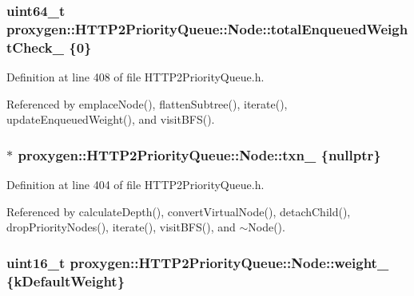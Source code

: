 \subsubsection[{total\+Enqueued\+Weight\+Check\+\_\+}]{\setlength{\rightskip}{0pt plus 5cm}uint64\+\_\+t proxygen\+::\+H\+T\+T\+P2\+Priority\+Queue\+::\+Node\+::total\+Enqueued\+Weight\+Check\+\_\+ \{0\}\hspace{0.3cm}{\ttfamily [private]}}\label{classproxygen_1_1HTTP2PriorityQueue_1_1Node_ac95d7fd8704179238ab387e7814ff7c3}


Definition at line 408 of file H\+T\+T\+P2\+Priority\+Queue.\+h.



Referenced by emplace\+Node(), flatten\+Subtree(), iterate(), update\+Enqueued\+Weight(), and visit\+B\+F\+S().

\subsubsection[{txn\+\_\+}]{$\ast$ proxygen\+::\+H\+T\+T\+P2\+Priority\+Queue\+::\+Node\+::txn\+\_\+ \{{\bf nullptr}\}\hspace{0.3cm}{\ttfamily [private]}}\label{classproxygen_1_1HTTP2PriorityQueue_1_1Node_a32229378e71b45aaf3b783fb4a186da2}


Definition at line 404 of file H\+T\+T\+P2\+Priority\+Queue.\+h.



Referenced by calculate\+Depth(), convert\+Virtual\+Node(), detach\+Child(), drop\+Priority\+Nodes(), iterate(), visit\+B\+F\+S(), and $\sim$\+Node().

\subsubsection[{weight\+\_\+}]{\setlength{\rightskip}{0pt plus 5cm}uint16\+\_\+t proxygen\+::\+H\+T\+T\+P2\+Priority\+Queue\+::\+Node\+::weight\+\_\+ \{{\bf k\+Default\+Weight}\}\hspace{0.3cm}{\ttfamily [private]}}\label{classproxygen_1_1HTTP2PriorityQueue_1_1Node_a498c8cf6394bb8e0b06c36a64d0f2bc2}


